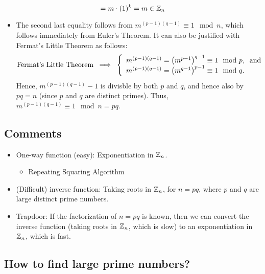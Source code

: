 \begin{itemize}
\begin{equation*}
	= m \cdot (1)^{k} = m \in \mathbb{Z}_{n}
	\end{equation*}
	\begin{itemize}
	\item	The second last equality follows from $m^{(p-1)(q-1)} \equiv 1 \mod n$, which 
		follows immediately from Euler's Theorem.  It can also be justified with
		Fermat's Little Theorem as follows:
		\begin{equation*}
		\textnormal{Fermat's Little Theorem}
		\;\;\Longrightarrow\;\;
		\left\{\begin{array}{l}
		m^{(p-1)(q-1)} = \left(m^{p-1}\right)^{q-1} \equiv 1 \mod p, \;\;\textnormal{and} \\
		m^{(p-1)(q-1)} = \left(m^{q-1}\right)^{p-1} \equiv 1 \mod q.
		\end{array}\right.
		\end{equation*}
		Hence, $m^{(p-1)(q-1)} - 1$ is divisble by both $p$ and $q$, and hence also by
		$pq = n$ (since $p$ and $q$ are distinct primes).
		Thus, $m^{(p-1)(q-1)} \equiv 1 \mod n = pq$.
	\end{itemize}
\end{itemize}

\subsection{Comments}

\begin{itemize}
\item	One-way function (easy): Exponentiation in $\mathbb{Z}_{n}$.
	\begin{itemize}
	\item	Repeating Squaring Algorithm
	\end{itemize}
\item	(Difficult) inverse function: Taking roots in $\mathbb{Z}_{n}$, for $n = pq$, where $p$ and $q$
	are large distinct prime numbers.
\item	Trapdoor: If the factorization of $n = pq$ is known, then we can convert the inverse
	function (taking roots in $\mathbb{Z}_{n}$, which is slow) to an exponentiation in $\mathbb{Z}_{n}$,
	which is fast.
\end{itemize}

\subsection{How to find large prime numbers?}

